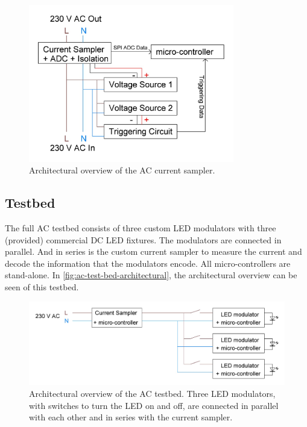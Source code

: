 \begin{figure}[htb]
	\centering
	\includegraphics[angle=0,width=0.8\textwidth,keepaspectratio]{chapters/hardware-chapters/ac-current-sampler-architectural.JPG}
	\caption{Architectural overview of the AC current sampler.}
	\label{fig:ac-current-sampler-architectural}
\end{figure}





\subsection{Testbed}
\label{subsec:ac-testbed}

The full AC testbed consists of three custom LED modulators with three (provided) commercial DC LED fixtures.
The modulators are connected in parallel. 
And in series is the custom current sampler to measure the current and decode the information that the modulators encode.
All micro-controllers are stand-alone.
In \autoref{fig:ac-test-bed-architectural}, the architectural overview can be seen of this testbed.

\begin{figure}[htb]
	\centering
	\includegraphics[angle=0,width=\textwidth,keepaspectratio]{chapters/hardware-chapters/ac-test-bed-architectural.JPG}
	\caption{Architectural overview of the AC testbed. Three LED modulators, with switches to turn the LED on and off, are connected in parallel with each other and in series with the current sampler.}
	\label{fig:ac-test-bed-architectural}
\end{figure}



